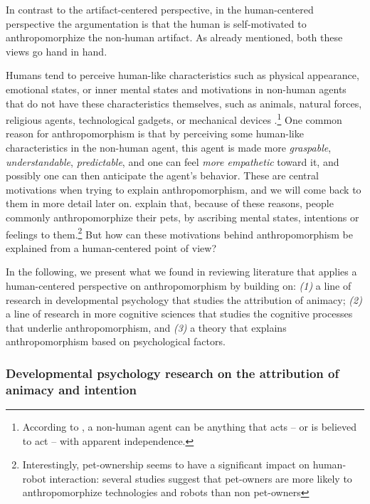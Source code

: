 \documentclass{frontiersSCNS} %
\begin{document}
In contrast to the artifact-centered perspective, in the human-centered
perspective the argumentation is that the human is self-motivated to
anthropomorphize the non-human artifact. As already mentioned, both these views
go hand in hand.

Humans tend to perceive human-like characteristics such as physical appearance,
emotional states, or inner mental states and motivations in non-human agents
that do not have these characteristics themselves, such as animals, natural
forces, religious agents, technological gadgets, or mechanical devices
\citep{epley_when_2008}.\footnote{According to \citet{epley_when_2008}, a
non-human agent can be anything that acts -- or is believed to act -- with
apparent independence.} One common reason for anthropomorphism is that by
perceiving some human-like characteristics in the non-human agent, this agent is
made more \emph{graspable}, \emph{understandable}, \emph{predictable}, and one
can feel \emph{more empathetic} toward it, and possibly one can then anticipate
the agent's behavior. These are central motivations when trying to explain
anthropomorphism, and we will come back to them in more detail later on.
\citet{eddy_attribution_1993} explain that, because of these reasons, people
commonly anthropomorphize their pets, by ascribing mental states, intentions or
feelings to them.\footnote{Interestingly, pet-ownership seems to have a
significant impact on human-robot interaction: several studies suggest that
pet-owners are more likely to anthropomorphize technologies and robots than
non pet-owners} But how can these motivations behind anthropomorphism be
explained from a human-centered point of view?

In the following, we present what we found in reviewing literature that applies
a human-centered perspective on anthropomorphism by building on: \textit{(1)} a
line of research in developmental psychology that studies the attribution of
animacy; \textit{(2)} a line of research in more cognitive sciences that studies
the cognitive processes that underlie anthropomorphism, and \textit{(3)} a
theory that explains anthropomorphism based on psychological factors. 


\subsubsection{Developmental psychology research on the attribution of animacy and intention\\}
\label{sec:developmental-expl}
\end{document}
